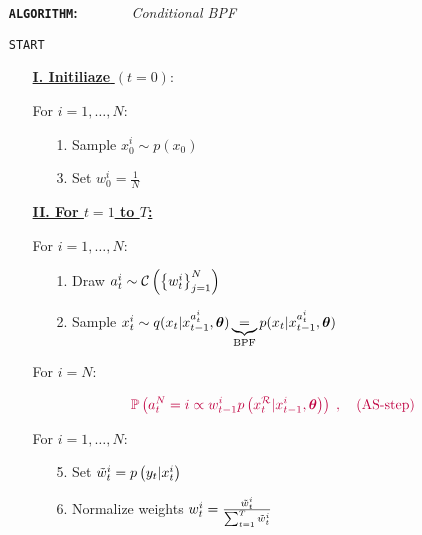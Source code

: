 
\begin{itemize}
\item[\textbf{\texttt{ALGORITHM}:}]~~~~~~~\textit{Conditional BPF}\label{ag:1}
\item[\texttt{START}]
\begin{itemize}
\item[] \underline{\textbf{I. Initiliaze} $(t=0):$}
\item[] For $i=1,\ldots,N$:
\begin{itemize}
\item[1.] Sample $x_{0}^i\sim p(x_0)$
\item[3.] Set $w_{0}^i=\frac{1}{N}$
\item[\tc{PineGreen}{2.}] 
\end{itemize} 
\item[] \underline{\textbf{II. For $t=1$ to $T$:}}
\item[] For $i=1,\ldots,N$:
\begin{itemize}
\item[1.] Draw $a_{t}^i\sim \mathcal{C}\left(\left\lbrace\wt\right\rbrace_{j=1}^N\right)$
\item[2.] Sample $\xt^i\sim q(\xt\given x_{t-1}^{a_{t}^i},\ts)\underbrace{=}_{\text{BPF}}p(\xt\given x_{t-1}^{a_{t}^i},\ts)$
\end{itemize}
\item[] For $i=N$:
\begin{itemize}
\item[\tc{PineGreen}{3.}] 
\item[\tc{purple}{4.}] 
\begin{align*}
\tc{purple}{\mathbb{P}\left(a_t^N=i\pt \wtt p\left(\xt^{\mathcal{R}}|\xtt^i,\ts\right)\right)\;,~~~\text{(AS-step)}}
\end{align*}
\end{itemize}
\item[] For $i=1,\ldots,N$:
\begin{itemize}
\item[5.] Set $\wtun=p\left(\yt|x_t^i\right)$
\item[6.] Normalize weights $\wt=\frac{\wtun}{\sumt \wtun}$

\end{itemize}
\end{itemize}
\end{itemize}
